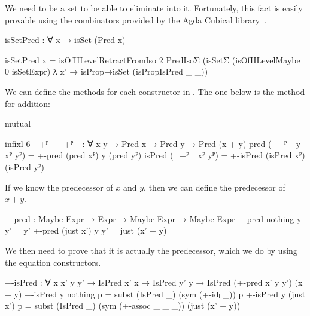 We need  to be a set to be able to eliminate into it.
Fortunately, this fact is easily provable using the combinators provided by the
Agda Cubical library~\cite{agda-cubical}.
\begin{code}
  isSetPred : ∀ x → isSet (Pred x)
\end{code}
\begin{code}[hide]
  isSetPred x =
    isOfHLevelRetractFromIso 2 PredIsoΣ
      (isSetΣ (isOfHLevelMaybe 0 isSetExpr) λ x' →
        isProp→isSet (isPropIsPred _ _))
\end{code}

We can define the methods for each constructor in . The one
below is the method for addition:
\begin{code}[hide]
  mutual
\end{code}
\begin{code}
    infixl 6 _+ᴾ_
    _+ᴾ_ : ∀ {x y} → Pred x → Pred y → Pred (x + y)
    pred    (_+ᴾ_ {y}  xᴾ yᴾ) = +-pred (pred xᴾ) y (pred yᴾ)
    isPred  (_+ᴾ_      xᴾ yᴾ) = +-isPred (isPred xᴾ) (isPred yᴾ)
\end{code}
If we know the predecessor of $x$ and $y$, then we can define the predecessor of
$x + y$.
\begin{code}
    +-pred :
      Maybe Expr → Expr → Maybe Expr → Maybe Expr
    +-pred nothing    y y' = y'
    +-pred (just x')  y y' = just (x' + y)
\end{code}
We then need to prove that it is actually the predecessor, which we do by using
the equation constructors.
\begin{code}
    +-isPred :
      ∀ {x x' y y'} → IsPred x' x → IsPred y' y →
      IsPred (+-pred x' y y') (x + y)
    +-isPred {y} nothing    p = subst (IsPred _) (sym (+-idₗ _)) p
    +-isPred {y} (just x')  p =
      subst (IsPred _) (sym (+-assoc _ _ _)) (just (x' + y))
\end{code}

